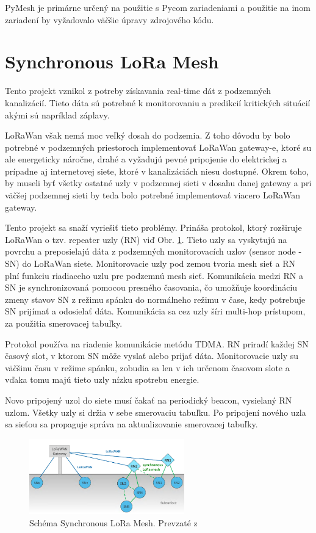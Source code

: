\documentclass[slovak,master]{diploma}
\begin{document}
PyMesh je primárne určený na použitie s Pycom zariadeniami a použitie na inom zariadení by vyžadovalo väčšie úpravy zdrojového kódu.

\section{Synchronous LoRa Mesh}
Tento projekt\cite{synchronouslorameshnetwork} vznikol z potreby získavania real-time dát z podzemných kanalizácií. Tieto dáta sú potrebné k monitorovaniu a predikcií kritických situácií akými 
sú napríklad záplavy.

LoRaWan však nemá moc veľký dosah do podzemia. Z toho dôvodu by bolo potrebné v podzemných priestoroch implementovať LoRaWan gateway-e, ktoré su ale energeticky náročne, drahé a vyžadujú 
pevné pripojenie do elektrickej a prípadne aj internetovej siete, ktoré v kanalizáciách niesu dostupné. Okrem toho, by museli byť všetky ostatné uzly v podzemnej sieti v dosahu danej gateway a pri väčšej podzemnej sieti 
by teda bolo potrebné implementovať viacero LoRaWan gateway.

Tento projekt sa snaží vyriešiť tieto problémy. Prináša protokol, ktorý rozširuje LoRaWan o tzv. repeater uzly (RN) viď Obr. \ref{fig:synchronouslora}. Tieto uzly sa vyskytujú na povrchu a preposielajú dáta z 
podzemných monitorovacích uzlov (sensor node  - SN) do LoRaWan siete. Monitorovacie uzly pod zemou tvoria mesh sieť a RN plní funkciu riadiaceho uzlu pre podzemnú mesh sieť. 
Komunikácia medzi RN a SN je synchronizovaná pomocou presného časovania, čo umožňuje koordináciu zmeny stavov SN z režimu spánku do normálneho režimu v čase, kedy 
potrebuje SN prijímať a odosielať dáta. Komunikácia sa cez uzly šíri multi-hop prístupom, za použitia smerovacej tabuľky.

Protokol používa na riadenie komunikácie metódu TDMA. RN priradí každej SN časový slot, v ktorom SN môže vyslať alebo prijať dáta.
Monitorovacie uzly su väčšinu času v režime spánku, zobudia sa len v ich určenom časovom slote a vďaka tomu majú tieto uzly nízku spotrebu energie.

Novo pripojený uzol do siete musí čakať na periodický beacon, vysielaný RN uzlom. Všetky uzly si držia v sebe smerovaciu tabuľku. Po pripojení nového uzla sa sieťou sa propaguje 
správa na aktualizovanie smerovacej tabuľky.

\begin{figure}
	\centering
	\includegraphics[width=0.6\textwidth]{Figures/synchronouslorameshnetwork.png}
	\caption{Schéma Synchronous LoRa Mesh. Prevzaté z \cite{synchronouslorameshnetwork}}
	\label{fig:synchronouslora}
\end{figure}
\end{document}

